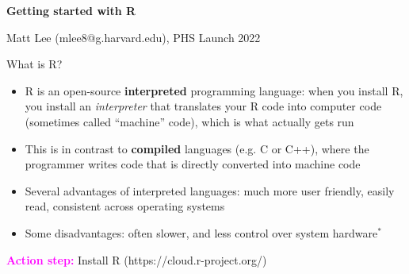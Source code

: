 \documentclass[svgnames,smaller]{beamer}\usepackage[]{graphicx}\usepackage[]{color}
\newcommand{\bmagenta}[1]{\textcolor{magenta}{\textbf{#1}}}
\begin{document}
{
\begin{frame}
\begin{center}
\vspace{0cm}\large \textcolor{SteelBlue!95}{\textbf{Getting started with R}} \\

{\color{Snow}\hrulefill}

\textcolor{SteelBlue!95}{Matt Lee (mlee8@g.harvard.edu), PHS Launch 2022}
\end{center}
\end{frame}
}

\small


\begin{frame}{What is R?}

\begin{itemize}
    \item R is an open-source \textbf{interpreted} programming language: when you install R, you install an \textit{interpreter} that translates your R code into computer code (sometimes called ``machine'' code), which is what actually gets run
    \item This is in contrast to \textbf{compiled} languages (e.g. C or C++), where the programmer writes code that is directly converted into machine code
    \item Several advantages of interpreted languages: much more user friendly, easily read, consistent across operating systems
    \item Some disadvantages: often slower, and less control over system hardware$^*$
\end{itemize}

\vspace{1em}

\bmagenta{Action step:} Install R (https://cloud.r-project.org/) 

\end{frame}


\end{document}
